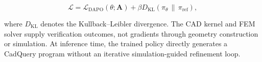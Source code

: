 \begin{equation}
\mathcal L
=\mathcal L_{\mathrm{DAPO}}(\theta;\mathbf A)
+\beta D_{\mathrm{KL}}(\pi_\theta\,\|\,\pi_{\mathrm{ref}}),
\label{eq:grpo}
\end{equation}

where \(D_{\mathrm{KL}}\) denotes the Kullback--Leibler divergence. The CAD kernel and FEM solver supply verification outcomes, not gradients through geometry construction or simulation. At inference time, the trained policy directly generates a CadQuery program without an iterative simulation-guided refinement loop.
























